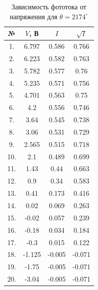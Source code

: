 \documentclass[12pt]{kiarticle} %
\begin{document}
		\begin{table}[h!]
		\caption{Зависимость фототока от напряжения для $ \theta = 2174^\circ $}
		\begin{center}
			\begin{tabular}{|c|c|c|c|}
				\hline
				 № & $ V $, В & $ I $ & $ \sqrt{I}  $ \\
				\hline
				 1. & 6.797 & 0.586 & 0.766 \\
				2. & 6.223 & 0.582 & 0.763 \\
				3. & 5.782 & 0.577 & 0.76 \\
				4. & 5.235 & 0.571 & 0.756 \\
				5. & 4.701 & 0.563 & 0.75 \\
				6. & 4.2 & 0.556 & 0.746 \\
				7. & 3.64 & 0.545 & 0.738 \\
				8. & 3.06 & 0.531 & 0.729 \\
				9. & 2.565 & 0.515 & 0.718 \\
				10. & 2.1 & 0.489 & 0.699 \\
				11. & 1.43 & 0.44 & 0.663 \\
				12. & 0.9 & 0.34 & 0.583 \\
				13. & 0.41 & 0.173 & 0.416 \\
				14. & 0.02 & 0.069 & 0.263 \\
				15. & -0.02 & 0.057 & 0.239 \\
				16. & -0.18 & 0.034 & 0.184 \\
				17. & -0.3 & 0.015 & 0.122 \\
				18. & -1.125 & -0.005 & -0.071 \\
				19. & -1.75 & -0.005 & -0.071 \\
				20. & -3.04 & -0.005 & -0.071 \\
				\hline 
			\end{tabular} 
		\end{center}
		\label{}
	\end{table}
\end{document}
